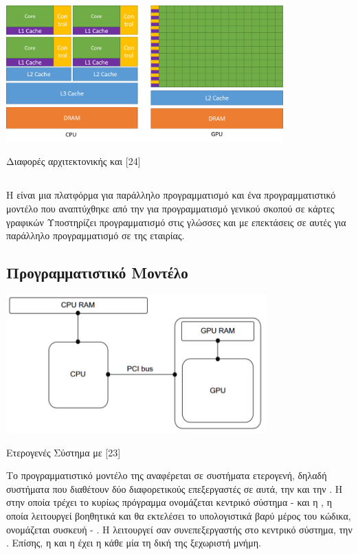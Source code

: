 \begin{Illustration}[!h] 
	\centering
	\includegraphics[width=0.8\textwidth]{images/image046.png} 
	\caption{Διαφορές αρχιτεκτονικής  και  [24]}
	\label{image-3.3}
\end{Illustration}

\subsection{}
Η  είναι μια πλατφόρμα για παράλληλο προγραμματισμό και ένα προγραμματιστικό μοντέλο που αναπτύχθηκε από την  για προγραμματισμό γενικού σκοπού σε κάρτες γραφικών  Υποστηρίζει προγραμματισμό στις γλώσσες  και  με επεκτάσεις σε αυτές για παράλληλο προγραμματισμό σε  της εταιρίας.

\subsection{Προγραμματιστικό Μοντέλο}

\begin{Illustration}[!h] 
	\centering
	\includegraphics[width=0.75\textwidth]{images/image047.png} 
	\caption{Ετερογενές Σύστημα με  [23]}
	\label{image-3.4}
\end{Illustration}

Το προγραμματιστικό μοντέλο της  αναφέρεται σε συστήματα ετερογενή, δηλαδή συστήματα που διαθέτουν δύο διαφορετικούς επεξεργαστές σε αυτά, την  και την . Η  στην οποία τρέχει το κυρίως πρόγραμμα ονομάζεται κεντρικό σύστημα -  και η , η οποία λειτουργεί βοηθητικά και θα εκτελέσει το υπολογιστικά βαρύ μέρος του κώδικα, ονομάζεται συσκευή - . Η  λειτουργεί σαν συνεπεξεργαστής στο κεντρικό σύστημα, την . Επίσης, η  και η  έχει η κάθε μία τη δική της ξεχωριστή μνήμη. 

